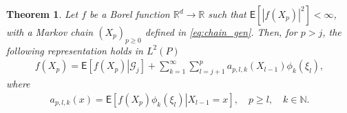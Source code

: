 \documentclass[bj]{imsart}
\newtheorem{thm}{Theorem}
\begin{document}
\begin{thm}\label{prop:29032018a1}
 Let $f$ be a Borel function $\mathbb{R}^{d}\to\mathbb R$ such that
$\mathsf{E}\left[\left|f(X_{p})\right|^{2}\right]<\infty$, with a Markov chain $(X_{p})_{p\geq 0}$ defined in \eqref{eq:chain_gen}.
Then,
for $p>j$, the following representation holds in \(L^2(P)\)
\begin{eqnarray}
\label{eq:mart_repr}
f(X_{p})=\mathsf{E}\left[\left.f(X_{p})\right|\mathcal G_{j}\right]+\sum_{k=1}^{\infty}\sum_{l=j+1}^{p}a_{p,l,k}(X_{l-1})\phi_k\left(\xi_{l}\right),
\end{eqnarray}
where
\begin{eqnarray}
\label{eq:coeff_mart}
a_{p,l,k}(x)=\mathsf{E}\left[\left.f(X_{p})\phi_k\left(\xi_{l}\right)\right|X_{l-1}=x\right], \quad p\geq l, \quad k\in \mathbb{N}.
\end{eqnarray}
\end{thm}
\end{document}
